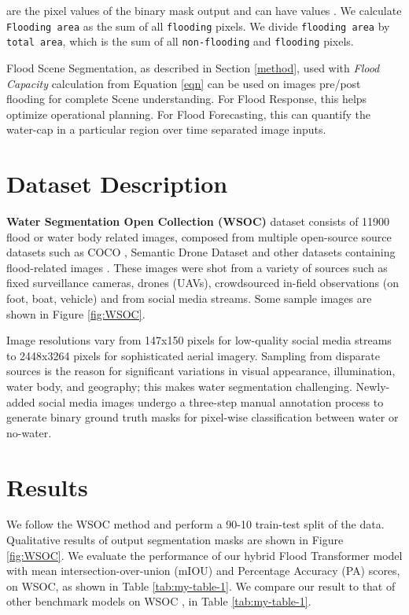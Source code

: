 \documentclass{article}
\begin{document}
 are the pixel values of the binary mask output and can have values . We calculate \verb|Flooding area| as the sum of all  \verb|flooding| pixels. We divide \verb|flooding area| by \verb|total area|, which is the sum of all  \verb|non-flooding| and  \verb|flooding| pixels. 

Flood Scene Segmentation, as described in Section \ref{method}, used with \textit{Flood Capacity} calculation from Equation \ref{eqn} can be used on images pre/post flooding for complete Scene understanding. For Flood Response, this helps optimize operational planning. For Flood Forecasting, this can quantify the water-cap in a particular region over time separated image inputs.



\section{Dataset Description}
\textbf{Water Segmentation Open Collection (WSOC)} dataset \cite{wsoc} consists of 11900 flood or water body related images, composed from multiple open-source source datasets such as COCO \cite{coco}, Semantic Drone Dataset \cite{semantic-drone} and other datasets containing flood-related images \cite{wsoc}. These images were shot from a variety of sources such as fixed surveillance cameras, drones (UAVs), crowdsourced in-field observations (on foot, boat, vehicle) and from social media streams. Some sample images are shown in Figure \ref{fig:WSOC}. 

Image resolutions vary from 147x150 pixels for low-quality social media streams to 2448x3264 pixels for sophisticated aerial imagery. 
Sampling from disparate sources is the reason for significant variations in visual appearance, illumination, water body, and geography; this makes water segmentation challenging. Newly-added social media images undergo a three-step manual annotation process to generate binary ground truth masks for pixel-wise classification between water or no-water. 

\section{Results}

We follow the WSOC method \cite{wsoc} and perform a 90-10 train-test split of the data. Qualitative results of output segmentation masks are shown in Figure \ref{fig:WSOC}. We evaluate the performance of our hybrid Flood Transformer model with mean intersection-over-union (mIOU) and Percentage Accuracy (PA) scores, on WSOC, as shown in Table \ref{tab:my-table-1}. We compare our result to that of other benchmark models on WSOC \cite{wsoc}, in Table \ref{tab:my-table-1}. 
\end{document}
